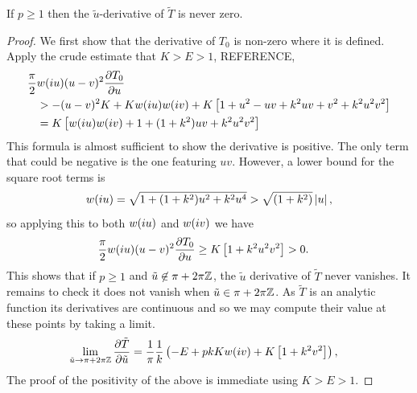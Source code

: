 \documentclass{article}
\begin{document}
\begin{lem}\label{lem:dTdu_nonzero}
If $p \geq 1$ then the $\tilde{u}$-derivative of $\tilde{T}$ is never zero.

\begin{proof}
We first show that the derivative of $T_0$ is non-zero where it is defined. Apply the crude estimate that $K>E>1$,
REFERENCE,
\begin{align*}
\frac{\pi}{2}&w(i u)(u-v)^2\frac{\partial T_0}{\partial u}\\
&> -(u-v)^2 K + Kw(i u)w(i v) + K\left[ 1 + u^2 - uv + k^2 uv + v^2 + k^2 u^2 v^2 \right] \\
&= K \left[ w(i u)w(i v) + 1 + (1 + k^2) uv + k^2 u^2 v^2 \right]
\end{align*}
This formula is almost sufficient to show the derivative is positive. The only term that could be negative is the one featuring $uv$. However, a lower bound for the square root terms is
\[
w(i u) = \sqrt{1 + (1+k^2)u^2 + k^2u^4} > \sqrt{(1+k^2)}\left|u\right|,
\]
so applying this to both $w(i u)$ and $w(i v)$ we have
\begin{align*}
\frac{\pi}{2}w(i u)(u-v)^2\frac{\partial T_0}{\partial u}
&\geq K \left[ 1 + k^2 u^2 v^2 \right] >0.
\end{align*}
This shows that if $p\geq 1$ and $\tilde{u} \not\in \pi + 2\pi\mathbb{Z}$, the $\tilde{u}$ derivative of $\tilde{T}$ never vanishes. It remains to check it does not vanish when $\tilde{u} \in \pi + 2\pi\mathbb{Z}$. As $\tilde{T}$ is an analytic function its derivatives are continuous and so we may compute their value at these points by taking a limit.
\begin{align*}
\lim_{\tilde{u}\to \pi + 2\pi\mathbb{Z}} \frac{\partial \tilde{T}}{\partial \tilde{u}}
&=\frac{1}{\pi} \frac{1}{k} \left(-E + pkKw(i v) + K\left[ 1 + k^2v^2 \right]\right),
\end{align*}
The proof of the positivity of the above is immediate using $K>E>1$.
\end{proof}
\end{lem}
\end{document}
